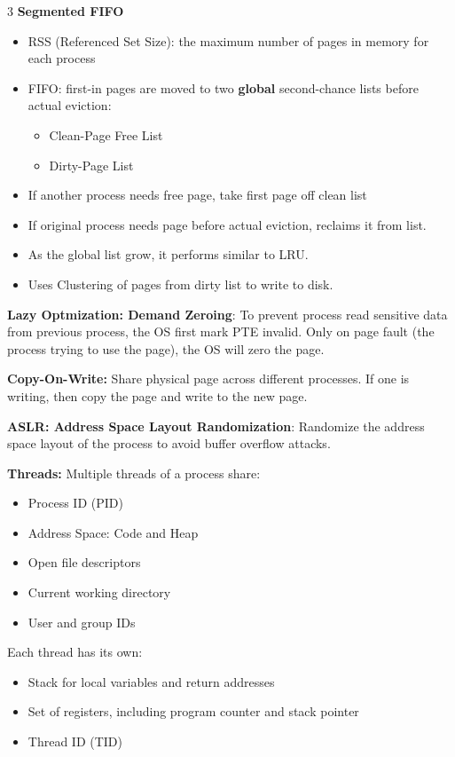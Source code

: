 \documentclass[8pt]{innovativeinnovation-cheatsheet}
\begin{document}
\begin{multicols*}{3}
\textbf{Segmented FIFO}
\begin{itemize}
      \item RSS (Referenced Set Size): the maximum number of pages in memory for each process
      \item FIFO: first-in pages are moved to two \textbf{global} second-chance lists before actual eviction:
      \begin{itemize}
            \item Clean-Page Free List
            \item Dirty-Page List
      \end{itemize}
      \item If another process needs free page, take first page off clean list
      \item If original process needs page before actual eviction, reclaims it from list.
      \item As the global list grow, it performs similar to LRU.
      \item Uses Clustering of pages from dirty list to write to disk.
\end{itemize}

\textbf{Lazy Optmization: Demand Zeroing}: To prevent process read sensitive data from previous process, the OS first mark PTE invalid. Only on page fault (the process trying to use the page), the OS will zero the page.

\textbf{Copy-On-Write:} Share physical page across different processes. If one is writing, then copy the page and write to the new page.

\textbf{ASLR: Address Space Layout Randomization}: Randomize the address space layout of the process to avoid buffer overflow attacks.

\vfill


\newpage



\textbf{Threads:} Multiple threads of a process share:
\begin{itemize}
      \item Process ID (PID)
      \item Address Space: Code and Heap
      \item Open file descriptors
      \item Current working directory
      \item User and group IDs
\end{itemize}
Each thread has its own:
\begin{itemize}
      \item Stack for local variables and return addresses
      \item Set of registers, including program counter and stack pointer
      \item Thread ID (TID)
\end{itemize}


\end{multicols*}
\end{document}

